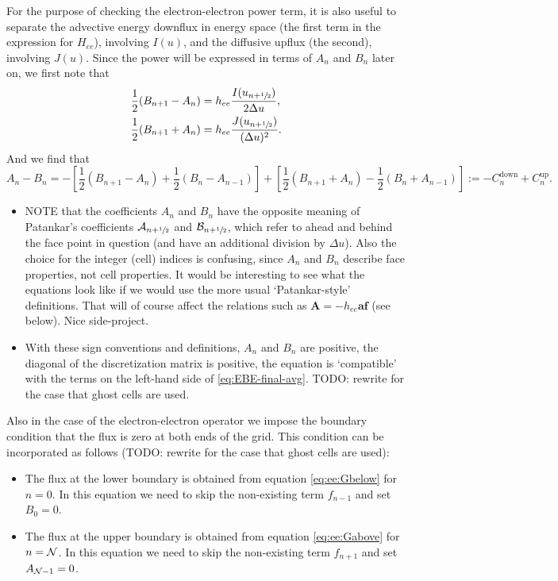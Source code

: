 \documentclass{book}
\newcommand{\frachalf}{\ensuremath{\sfrac{1}{2}}}
\newcommand{\phalf}[1]{\ensuremath{{#1}+\frachalf}}
\newcommand{\bmat}[1]{{\ensuremath{\bm {#1}}}}
\newcommand{\bvec}[1]{{\ensuremath{\bm {#1}}}}
\begin{document}
For the purpose of checking the electron-electron power term, it is also useful to separate
the advective energy downflux in energy space (the first term in the expression for $H_{ee}$), involving
$I(u)$, and the diffusive upflux (the second), involving $J(u)$. Since the power will be expressed in terms of
$A_n$ and $B_n$ later on, we first note that
\begin{align}
	\frac{1}{2}(B_{n+1}-A_n)  &= h_{ee}\frac{I(u_{\phalf{n}})}{2\Delta u}, \\
	\frac{1}{2}(B_{n+1}+A_n)  &= h_{ee}\frac{J(u_{\phalf{n}})}{(\Delta u)^2}.
\end{align}
And we find that
\begin{equation}
    A_n-B_n =
	-\left[\frac{1}{2}\left(B_{n+1}-A_n\right) + \frac{1}{2}\left(B_n-A_{n-1}\right)\right]
	+\left[\frac{1}{2}\left(B_{n+1}+A_n\right) - \frac{1}{2}\left(B_n+A_{n-1}\right)\right]
	:= -C^{\text{down}}_n + C^{\text{up}}_n.
\end{equation}
\begin{framed}
\begin{itemize}
	\item NOTE that the coefficients $A_n$ and $B_n$ have the opposite meaning of
	Patankar's coefficients ${\cal A}_{n+\frachalf}$ and ${\cal B}_{n+\frachalf}$,
	which refer to ahead and behind the face point in question (and have an additional
	division by $\Delta u$). Also the choice
	for the integer (cell) indices is confusing, since $A_n$ and $B_n$ describe
	face properties, not cell properties. It would be interesting to see what the
	equations look like if we would use the more usual `Patankar-style' definitions.
	That will of course affect the relations such as $\bvec{A}=-h_{ee}\bmat{a}\bvec{f}$
	(see below). Nice side-project.
	\item With these sign conventions and definitions, $A_n$ and $B_n$ are positive,
	the diagonal of the discretization matrix is positive, the equation is
	`compatible' with the terms on the left-hand side of \eqref{eq:EBE-final-avg}.
	TODO: rewrite for the case that ghost cells are used.
\end{itemize}
\end{framed}

Also in the case of the electron-electron operator we impose the boundary condition
that the flux is zero at both ends of the grid. This condition can be incorporated
as follows (TODO: rewrite for the case that ghost cells are used):
\begin{itemize}
	\item The flux at the lower boundary is obtained from equation \eqref{eq:ee:Gbelow}
	for $n=0$. In this equation we need to skip the non-existing term $f_{n-1}$ and
	set $B_0=0$.
	\item The flux at the upper boundary is obtained from equation \eqref{eq:ee:Gabove}
	for $n={\cal N}$. In this equation we need to skip the non-existing term $f_{n+1}$ and
	set $A_{{\cal N}-1}=0$.
\end{itemize}
\end{document}
